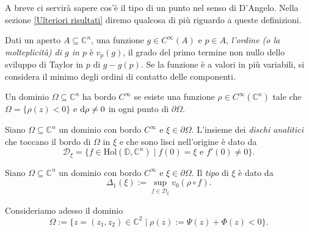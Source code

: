 A breve ci servirà sapere cos'è il tipo di un punto nel senso di D'Angelo. Nella sezione \ref{Ulteriori risultati} diremo qualcosa di più riguardo a queste definizioni.

\begin{defn}
    Dati un aperto $A\subseteq\mathbb{C}^n$, una funzione $g\in C^\infty(A)$ e $p\in A$, \textit{l'ordine (o la molteplicità) di $g$ in $p$} è $v_p(g)$, il grado del primo termine non nullo dello sviluppo di Taylor in $p$ di $g-g(p)$. Se la funzione è a valori in più variabili, si considera il minimo degli ordini di contatto delle componenti.
\end{defn}

\begin{defn}
    Un dominio $\Omega\subseteq\mathbb{C}^n$ ha bordo $C^\infty$ se esiste una funzione $\rho\in C^\infty(\mathbb{C}^n)$ tale che $\Omega=\{\rho(z)<0\}$ e $\mathop{}\!\mathrm{d}\rho\not=0$ in ogni punto di $\partial\Omega$.
\end{defn}
    
\begin{defn} \label{discanal}
    Siano $\Omega\subseteq\mathbb{C}^n$ un dominio con bordo $C^\infty$ e $\xi\in\partial\Omega$. L'insieme dei \textit{dischi analitici} che toccano il bordo di $\Omega$ in $\xi$ e che sono lisci nell'origine è dato da
    $$\mathcal{D}_{\xi}=\{f\in\text{Hol}(\mathbb{D},\mathbb{C}^n)\mid f(0)=\xi\text{ e }f'(0)\not=0\}.$$
\end{defn}

\begin{defn}
    Siano $\Omega\subseteq\mathbb{C}^n$ un dominio con bordo $C^\infty$ e $\xi\in\partial\Omega$. Il \textit{tipo} di $\xi$ è dato da
    $$\Delta_1(\xi):=\sup_{f\in\mathcal{D}_{\xi}} v_0(\rho\circ f).$$
\end{defn}

Consideriamo adesso il dominio
$$\Omega:=\{z=(z_1,z_2)\in\mathbb{C}^2\mid \rho(z):=\Psi(z)+\Phi(z)<0\}.$$


